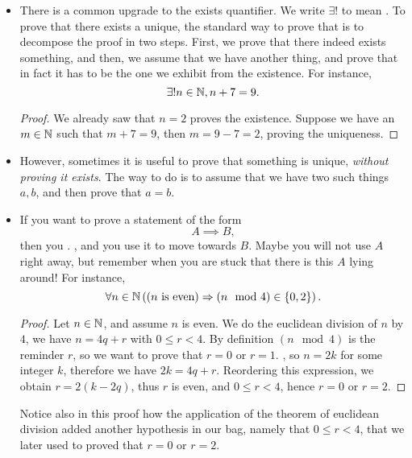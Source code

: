 \begin{itemize}
    \item There is a common upgrade to the exists quantifier. We write \( \exists! \) to mean . To prove that there exists a unique, the standard way to prove that is to decompose the proof in two steps. First, we prove that there indeed exists something, and then, we assume that we have another thing, and prove that in fact it has to be the one we exhibit from the existence. For instance,
    \begin{equation*}
        \exists! n \in \mathbb{N}, n + 7 = 9.
    \end{equation*}
    \begin{proof}
        We already saw that \( n = 2 \) proves the existence. Suppose we have an \( m \in \mathbb{N} \) such that \( m + 7 = 9 \), then \( m = 9 - 7 = 2 \), proving the uniqueness.
    \end{proof}

    \item However, sometimes it is useful to prove that something is unique, \textit{without proving it exists}. The way to do is to assume that we have two such things \( a, b \), and then prove that \( a = b \).
    
    \item If you want to prove a statement of the form
    \begin{equation*}
        A \implies B,
    \end{equation*}
    then you . , and you use it to move towards \( B \). Maybe you will not use \( A \) right away, but remember when you are stuck that there is this \( A \) lying around! For instance,
    \begin{equation*}
        \forall n \in \mathbb{N} \left((n \text{ is even}) \Rightarrow (n \mod 4) \in \{ 0, 2 \} \right).
    \end{equation*}
    \begin{proof}
        Let \( n \in \mathbb{N} \), and assume \( n \) is even. We do the euclidean division of \( n \) by \( 4 \), we have \( n = 4q + r \) with \( 0 \le r < 4 \). By definition \( (n \mod 4) \) is the reminder \( r \), so we want to prove that \( r = 0 \) or \( r = 1 \). , so \( n = 2k \) for some integer \( k \), therefore we have \( 2k = 4q + r \). Reordering this expression, we obtain \( r = 2(k-2q) \), thus \( r \) is even, and \( 0 \le r < 4 \), hence \( r = 0 \) or \( r = 2 \).
    \end{proof}
    Notice also in this proof how the application of the theorem of euclidean division added another hypothesis in our bag, namely that \( 0 \le r < 4 \), that we later used to proved that \( r = 0 \) or \( r = 2 \).


\end{itemize}
